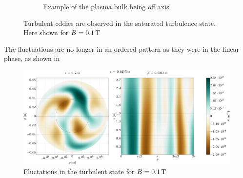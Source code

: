 \begin{figure}[htbp]
\begin{subfigure}[h]{1.00\textwidth}
        \caption{Example of the plasma bulk being off axis}
        \label{fig:offcenter}
    \end{subfigure}
    \caption{Turbulent eddies are observed in the saturated turbulence state.
    Here shown for $B=0.1\, \text{T}$}
\end{figure}
%
The fluctuations are no longer in an ordered pattern as they were in the linear phase, as shown in
%
\begin{figure}[htb]
    \centering
    \includegraphics[width=1.0\textwidth]{fig/results/2DTurbulence/fluct}
    \caption{Fluctations in the turbulent state for $B=0.1\, \text{T}$}
    \label{fig:2DFluct}
\end{figure}
%

